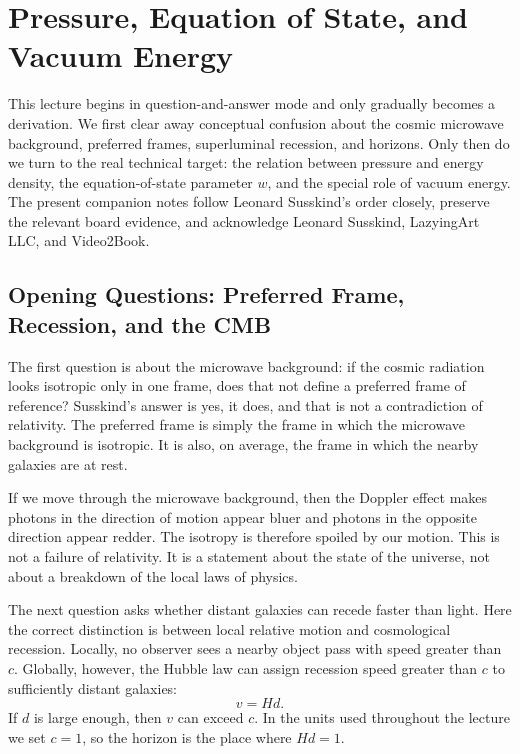 \chapter{Pressure, Equation of State, and Vacuum Energy}

This lecture begins in question-and-answer mode and only gradually becomes a derivation. We first clear away conceptual confusion about the cosmic microwave background, preferred frames, superluminal recession, and horizons. Only then do we turn to the real technical target: the relation between pressure and energy density, the equation-of-state parameter \(w\), and the special role of vacuum energy. The present companion notes follow Leonard Susskind's order closely, preserve the relevant board evidence, and acknowledge Leonard Susskind, LazyingArt LLC, and Video2Book.

\section{Opening Questions: Preferred Frame, Recession, and the CMB}

The first question is about the microwave background: if the cosmic radiation looks isotropic only in one frame, does that not define a preferred frame of reference? Susskind's answer is yes, it does, and that is not a contradiction of relativity. The preferred frame is simply the frame in which the microwave background is isotropic. It is also, on average, the frame in which the nearby galaxies are at rest.

If we move through the microwave background, then the Doppler effect makes photons in the direction of motion appear bluer and photons in the opposite direction appear redder. The isotropy is therefore spoiled by our motion. This is not a failure of relativity. It is a statement about the state of the universe, not about a breakdown of the local laws of physics.

The next question asks whether distant galaxies can recede faster than light. Here the correct distinction is between local relative motion and cosmological recession. Locally, no observer sees a nearby object pass with speed greater than \(c\). Globally, however, the Hubble law can assign recession speed greater than \(c\) to sufficiently distant galaxies:
\begin{equation}
v = H d .
\end{equation}
If \(d\) is large enough, then \(v\) can exceed \(c\). In the units used throughout the lecture we set \(c=1\), so the horizon is the place where \(Hd=1\).

